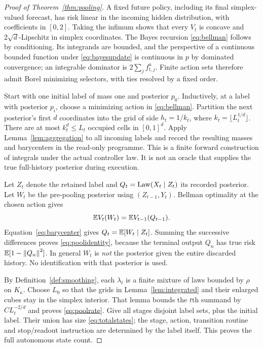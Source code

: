 \begin{proof}[Proof of Theorem~\ref{thm:pooling}]
A fixed future policy, including its final simplex-valued forecast, has risk linear in the incoming hidden distribution, with coefficients in $[0,2]$. Taking the infimum shows that every $V_t$ is concave and $2\sqrt d$-Lipschitz in simplex coordinates. The Bayes recursion \eqref{eq:bellman} follows by conditioning. Its integrands are bounded, and the perspective of a continuous bounded function under \eqref{eq:bayesupdate} is continuous in $p$ by dominated convergence; an integrable dominator is $2\sum_j f_{t,j}^a$. Finite action sets therefore admit Borel minimizing selectors, with ties resolved by a fixed order.

Start with one initial label of mass one and posterior $p_0$. Inductively, at a label with posterior $p_i$, choose a minimizing action in \eqref{eq:bellman}. Partition the next posterior's first $d$ coordinates into the grid of side $h_t=1/k_t$, where $k_t=\lfloor L_t^{1/d}\rfloor$. There are at most $k_t^d\le L_t$ occupied cells in $[0,1]^d$. Apply Lemma~\ref{lem:aggregation} to all incoming labels and record the resulting masses and barycenters in the read-only programme. This is a finite forward construction of integrals under the actual controller law. It is not an oracle that supplies the true full-history posterior during execution.

Let $Z_t$ denote the retained label and $Q_t=\operatorname{Law}(X_t\mid Z_t)$ its recorded posterior. Let $W_t$ be the pre-pooling posterior using $(Z_{t-1},Y_t)$. Bellman optimality at the chosen action gives
\[
 \mathbb E V_t(W_t)=\mathbb E V_{t-1}(Q_{t-1}).
\]
Equation~\eqref{eq:barycenter} gives $Q_t=\mathbb E[W_t\mid Z_t]$. Summing the successive differences proves \eqref{eq:poolidentity}, because the terminal output $Q_n$ has true risk $\mathbb E[1-\left\lVert Q_n\right\rVert^2]$. In general $W_t$ is \emph{not} the posterior given the entire discarded history. No identification with that posterior is used.

By Definition~\ref{def:smoothing}, each $\lambda_t$ is a finite mixture of laws bounded by $\rho$ on $K_\kappa$. Choose $L_0$ so that the grids in Lemma~\ref{lem:integrated} and their enlarged cubes stay in the simplex interior. That lemma bounds the $t$th summand by $CL_t^{-2/d}$ and proves \eqref{eq:poolrate}. Give all stages disjoint label sets, plus the initial label. Their union has size \eqref{eq:totalstates}; the stage, action, transition routine and stop/readout instruction are determined by the label itself. This proves the full autonomous state count.


\end{proof}
